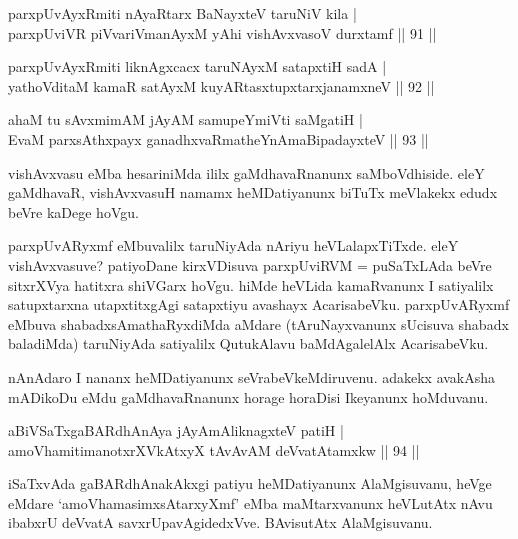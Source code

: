 \begin{shl}
parxpUvAyxRmiti nAyaRtarx BaNayxteV taruNiV kila | \\
parxpUviVR piVvariVmanAyxM yAhi vishAvxvasoV durxtamf \hfill|| 91 || 
\end{shl}

\begin{shl}
parxpUvAyxRmiti liknAgxcacx taruNAyxM satapxtiH sadA | \\
yathoVditaM kamaR satAyxM kuyARtasxtupxtarxjanamxneV \hfill|| 92 || 
\end{shl}

\begin{shl}
ahaM tu sAvxmimAM jAyAM samupeYmiVti saMgatiH | \\
EvaM parxsAthxpayx ganadhxvaRmatheYnAmaBipadayxteV \hfill|| 93 || 
\end{shl}

\begin{artha}
vishAvxvasu eMba hesariniMda ililx gaMdhavaRnanunx saMboVdhiside. eleY 
gaMdhavaR, vishAvxvasuH namamx heMDatiyanunx biTuTx meVlakekx edudx 
beVre kaDege hoVgu.
\end{artha}

\begin{artha}
parxpUvARyxmf eMbuvalilx taruNiyAda nAriyu heVLalapxTiTxde. eleY 
vishAvxvasuve? patiyoDane kirxVDisuva parxpUviRVM = puSaTxLAda beVre 
sitxrXVya hatitxra shiVGarx hoVgu. hiMde heVLida kamaRvanunx I 
satiyalilx satupxtarxna utapxtitxgAgi satapxtiyu avashayx 
AcarisabeVku. parxpUvARyxmf eMbuva shabadxsAmathaRyxdiMda aMdare 
(tAruNayxvanunx sUcisuva shabadx baladiMda) taruNiyAda satiyalilx 
QutukAlavu baMdAgalelAlx AcarisabeVku.
\end{artha}

\begin{artha}
nAnAdaro I nananx heMDatiyanunx seVrabeVkeMdiruvenu. adakekx avakAsha 
mADikoDu eMdu gaMdhavaRnanunx horage horaDisi Ikeyanunx hoMduvanu.
\end{artha}

\begin{shl}
aBiVSaTxgaBARdhAnAya jAyAmAliknagxteV patiH | \\
amoV\s hamitimanotxrXVkAtxyX tAvAvAM deVvatAtamxkw \hfill|| 94 || 
\end{shl}

\begin{artha}
iSaTxvAda gaBARdhAnakAkxgi patiyu heMDatiyanunx AlaMgisuvanu, heVge 
eMdare `amoVhamasimxsAtarxyXmf' eMba maMtarxvanunx heVLutAtx nAvu 
ibabxrU deVvatA savxrUpavAgidedxVve. BAvisutAtx AlaMgisuvanu.
\end{artha}

